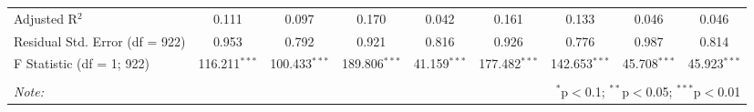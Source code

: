 \begin{table}[!htbp]
\begin{tabular}{@{\extracolsep{1pt}}lcccccccc}
Adjusted R$^{2}$ & 0.111 & 0.097 & 0.170 & 0.042 & 0.161 & 0.133 & 0.046 & 0.046 \\ 
Residual Std. Error (df = 922) & 0.953 & 0.792 & 0.921 & 0.816 & 0.926 & 0.776 & 0.987 & 0.814 \\ 
F Statistic (df = 1; 922) & 116.211$^{***}$ & 100.433$^{***}$ & 189.806$^{***}$ & 41.159$^{***}$ & 177.482$^{***}$ & 142.653$^{***}$ & 45.708$^{***}$ & 45.923$^{***}$ \\ 
\hline 
\hline \\[-1.8ex] 
\textit{Note:}  & \multicolumn{8}{r}{$^{*}$p$<$0.1; $^{**}$p$<$0.05; $^{***}$p$<$0.01} \\ 
\end{tabular} 
\end{table} 

